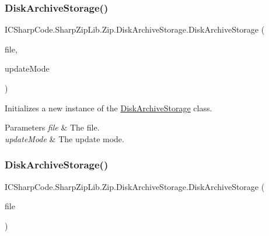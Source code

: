 \subsubsection{\texorpdfstring{Disk\+Archive\+Storage()}{DiskArchiveStorage()}\hspace{0.1cm}{\footnotesize\ttfamily [1/2]}}
{\footnotesize\ttfamily I\+C\+Sharp\+Code.\+Sharp\+Zip\+Lib.\+Zip.\+Disk\+Archive\+Storage.\+Disk\+Archive\+Storage (\begin{DoxyParamCaption}\item[{\hyperlink{class_i_c_sharp_code_1_1_sharp_zip_lib_1_1_zip_1_1_zip_file}{Zip\+File}}]{file,  }\item[{\hyperlink{namespace_i_c_sharp_code_1_1_sharp_zip_lib_1_1_zip_a626313bc452203ca2bdb092947541027}{File\+Update\+Mode}}]{update\+Mode }\end{DoxyParamCaption})\hspace{0.3cm}{\ttfamily [inline]}}



Initializes a new instance of the \hyperlink{class_i_c_sharp_code_1_1_sharp_zip_lib_1_1_zip_1_1_disk_archive_storage}{Disk\+Archive\+Storage} class. 


\begin{DoxyParams}{Parameters}
{\em file} & The file.\\
\hline
{\em update\+Mode} & The update mode.\\
\hline
\end{DoxyParams}
\mbox{\label{class_i_c_sharp_code_1_1_sharp_zip_lib_1_1_zip_1_1_disk_archive_storage_a450194560007dfa524612919eee546b0}} 
\subsubsection{\texorpdfstring{Disk\+Archive\+Storage()}{DiskArchiveStorage()}\hspace{0.1cm}{\footnotesize\ttfamily [2/2]}}
{\footnotesize\ttfamily I\+C\+Sharp\+Code.\+Sharp\+Zip\+Lib.\+Zip.\+Disk\+Archive\+Storage.\+Disk\+Archive\+Storage (\begin{DoxyParamCaption}\item[{\hyperlink{class_i_c_sharp_code_1_1_sharp_zip_lib_1_1_zip_1_1_zip_file}{Zip\+File}}]{file }\end{DoxyParamCaption})\hspace{0.3cm}{\ttfamily [inline]}}



